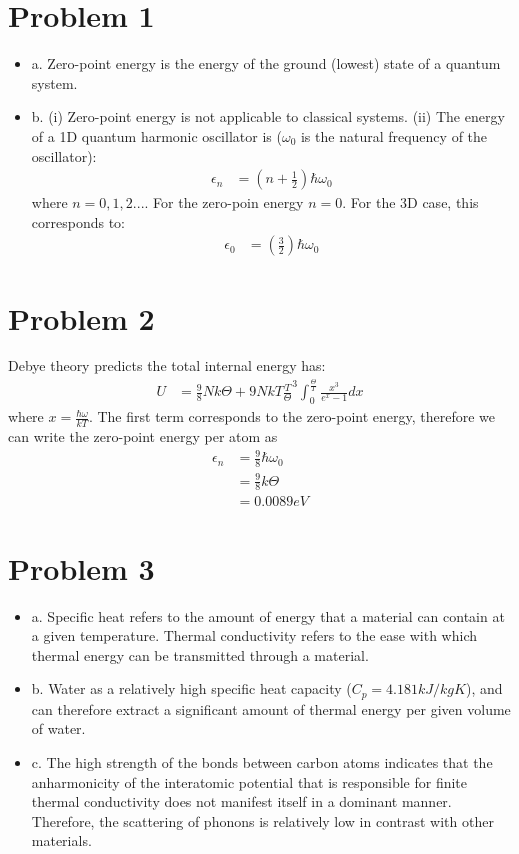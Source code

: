 \documentclass{article}
\numberwithin{equation}{section}
\begin{document}
\section*{Problem 1}

\begin{itemize}
\item a. Zero-point energy is the energy of the ground (lowest) state of a quantum system.

\item b. (i) Zero-point energy is not applicable to classical systems. (ii) The energy of a 1D quantum harmonic oscillator is ($\omega_0$ is the natural frequency of the oscillator):
\begin{align*}
	\epsilon_n &= (n+\frac{1}{2})\hbar \omega_0
\end{align*}
where $n=0,1,2...$. For the zero-poin energy $n=0$. For the 3D case, this corresponds to:
\begin{align*}
	\epsilon_0 &= (\frac{3}{2})\hbar \omega_0
\end{align*}
\end{itemize}
\section*{Problem 2}
Debye theory predicts the total internal energy has:
\begin{align*}
	U &= \frac{9}{8}Nk\Theta+9NkT\frac{T}{\Theta}^3\int_0^\frac{\Theta}{T} \frac{x^3}{e^x-1} dx
\end{align*}
where $x=\frac{\hbar\omega}{kT}$. The first term corresponds to the zero-point energy, therefore we can write the zero-point energy per atom as
\begin{align*}
	\epsilon_n &= \frac{9}{8}\hbar \omega_0
\\       &= \frac{9}{8}k\Theta
\\       &= 0.0089 eV
\end{align*}

\section*{Problem 3}
\begin{itemize}
\item a. Specific heat refers to the amount of energy that a material can contain at a given temperature. Thermal conductivity refers to the ease with which thermal energy can be transmitted through a material.
\item b. Water as a relatively high specific heat capacity ($C_p=4.181 kJ/kgK$), and can therefore extract a significant amount of thermal energy per given volume of water.
\item c. The high strength of the bonds between carbon atoms indicates that the anharmonicity of the interatomic potential that is responsible for finite thermal conductivity does not manifest itself in a dominant manner. Therefore, the scattering of phonons is relatively low in contrast with other materials.
\end{itemize}
\end{document}
